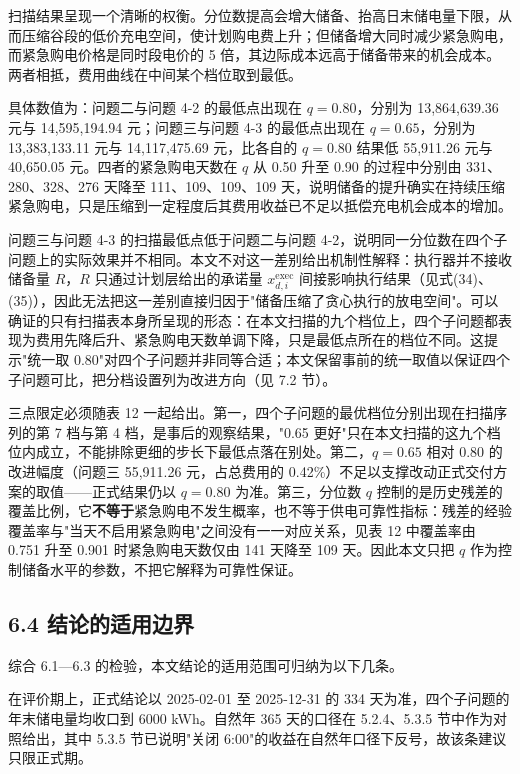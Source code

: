 \documentclass[12pt,a4paper]{ctexart}
\begin{document}
扫描结果呈现一个清晰的权衡。分位数提高会增大储备、抬高日末储电量下限，从而压缩谷段的低价充电空间，使计划购电费上升；但储备增大同时减少紧急购电，而紧急购电价格是同时段电价的 5 倍，其边际成本远高于储备带来的机会成本。两者相抵，费用曲线在中间某个档位取到最低。

具体数值为：问题二与问题 4-2 的最低点出现在 $q=0.80$，分别为 13,864,639.36 元与 14,595,194.94 元；问题三与问题 4-3 的最低点出现在 $q=0.65$，分别为 13,383,133.11 元与 14,117,475.69 元，比各自的 $q=0.80$ 结果低 55,911.26 元与 40,650.05 元。四者的紧急购电天数在 $q$ 从 0.50 升至 0.90 的过程中分别由 331、280、328、276 天降至 111、109、109、109 天，说明储备的提升确实在持续压缩紧急购电，只是压缩到一定程度后其费用收益已不足以抵偿充电机会成本的增加。

问题三与问题 4-3 的扫描最低点低于问题二与问题 4-2，说明同一分位数在四个子问题上的实际效果并不相同。本文不对这一差别给出机制性解释：执行器并不接收储备量 $R$，$R$ 只通过计划层给出的承诺量 $x_{d,i}^{\mathrm{exec}}$ 间接影响执行结果（见式(34)、(35)），因此无法把这一差别直接归因于"储备压缩了贪心执行的放电空间"。可以确证的只有扫描表本身所呈现的形态：在本文扫描的九个档位上，四个子问题都表现为费用先降后升、紧急购电天数单调下降，只是最低点所在的档位不同。这提示"统一取 0.80"对四个子问题并非同等合适；本文保留事前的统一取值以保证四个子问题可比，把分档设置列为改进方向（见 7.2 节）。

三点限定必须随表 12 一起给出。第一，四个子问题的最优档位分别出现在扫描序列的第 7 档与第 4 档，是事后的观察结果，"0.65 更好"只在本文扫描的这九个档位内成立，不能排除更细的步长下最低点落在别处。第二，$q=0.65$ 相对 $0.80$ 的改进幅度（问题三 55,911.26 元，占总费用的 0.42\%）不足以支撑改动正式交付方案的取值——正式结果仍以 $q=0.80$ 为准。第三，分位数 $q$ 控制的是历史残差的覆盖比例，它\textbf{不等于}紧急购电不发生概率，也不等于供电可靠性指标：残差的经验覆盖率与"当天不启用紧急购电"之间没有一一对应关系，见表 12 中覆盖率由 0.751 升至 0.901 时紧急购电天数仅由 141 天降至 109 天。因此本文只把 $q$ 作为控制储备水平的参数，不把它解释为可靠性保证。

\subsection*{6.4 结论的适用边界}

综合 6.1—6.3 的检验，本文结论的适用范围可归纳为以下几条。

在评价期上，正式结论以 2025-02-01 至 2025-12-31 的 334 天为准，四个子问题的年末储电量均收口到 6000 kWh。自然年 365 天的口径在 5.2.4、5.3.5 节中作为对照给出，其中 5.3.5 节已说明"关闭 6:00"的收益在自然年口径下反号，故该条建议只限正式期。
\end{document}
